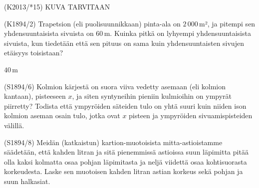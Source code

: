 \begin{tehtava} 
(K2013/*15) KUVA TARVITAAN
				\begin{vastaus}
				\end{vastaus}
\end{tehtava}


\begin{tehtava} 
(K1894/2) Trapetsion (eli puolisuunnikkaan) pinta-ala on $2\,000$\,m², ja pitempi sen yhdensuuntaisista sivuista on $60$\,m. Kuinka pitkä on lyhyempi yhdensuuntaisista sivuista, kun tiedetään että sen pituus on sama kuin yhdensuuntaisten sivujen etäisyys toisistaan?
  \begin{vastaus}
  $40$\,m
  \end{vastaus}
\end{tehtava}

\begin{tehtava} 
(S1894/6) Kolmion kärjestä on suora viiva vedetty asemaan (eli kolmion kantaan), pisteeseen $x$, ja siten syntyneihin pieniin kulmioihin on ympyrät piirretty? Todista että ympyröiden säteiden tulo on yhtä suuri kuin niiden ison kolmion aseman osain tulo, jotka ovat $x$ pisteen ja ympyröiden sivuamispisteiden välillä.  
\end{tehtava}

\begin{tehtava} 
(S1894/8) Meidän (katkaistun) kartion-muotoisista mitta-astioistamme säädetään, että kahden litran ja sitä pienemmissä astioissa suun läpimitta pitää olla kaksi kolmatta osaa pohjan läpimitasta ja neljä viidettä osaa kohtisuorasta korkeudesta. Laske sen muotoisen kahden litran astian korkeus sekä pohjan ja suun halkasiat.
  \begin{vastaus}
  \end{vastaus}
\end{tehtava}
